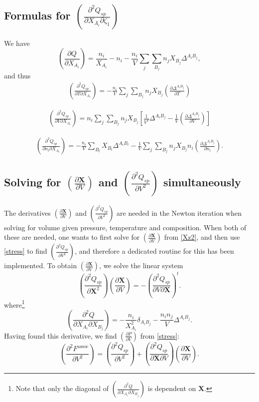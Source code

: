 \documentclass[10pt, a4paper]{article}
\newcommand{\mbf}[0]{\mathbf}
\newcommand*{\pder}[2]{\left(\frac{\partial #1}{\partial #2}\right)}
\newcommand*{\pdder}[2]{\left(\frac{\partial^2 #1}{\partial #2^2}\right)}
\newcommand*{\pdcross}[3]{\left(\frac{\partial^2 #1}{\partial #2 \partial #3}\right)}
\newcommand{\z}{\zeta}
\begin{document}
\subsection{Formulas for $\pdcross{Q_{sp}}{X_{A_i}}{\z_1}$}
We have
\begin{equation}
  \pder{Q}{X_{A_i}} = \frac{n_i}{X_{A_i}} - n_i  - \frac{n_i}{V} \sum_{j} \sum_{B_j} n_j X_{B_j} \Delta^{A_i B_j},
\end{equation}
and thus
\begin{align*}
  \pdcross{Q_{sp}}{T}{X_{A_i}} = -\frac{n_i}{V} \sum_{j} \sum_{B_j} n_j X_{B_j} \pder{\Delta^{A_i B_j}}{T}
\end{align*}

\begin{align*}
  \pdcross{Q_{sp}}{V}{X_{A_i}} = n_i \sum_{j} \sum_{B_j} n_j X_{B_j} \left[ \frac{1}{V^2} \Delta^{A_i B_j} - \frac{1}{V} \pder{\Delta^{A_i B_j}}{V} \right]
\end{align*}

\begin{align*}
  \pdcross{Q_{sp}}{n_l}{X_{A_i}} = - \frac{n_i}{V} \sum_{B_l} X_{B_l} \Delta^{A_i B_l} - \frac{1}{V} \sum_{j} \sum_{B_j} n_j X_{B_j} n_i \pder{\Delta^{A_i B_j}}{n_l}.
\end{align*}

\subsection{Solving for $\pder{\mbf X}{V}$ and $\pdder{Q_{sp}}{V}$ simultaneously}
The derivatives $\pder{\mbf X}{V}$ and $\pdder{Q_{sp}}{V}$ are needed in the Newton iteration when solving for volume given pressure, temperature and composition. When both of these are needed, one wants to first solve for $\pder{\mbf X}{V}$ from \eqref{Xz2}, and then use \eqref{stress} to find $\pdder{Q_{sp}}{V}$, and therefore a dedicated routine for this has been implemented. To obtain $\pder{\mbf X}{V}$, we solve the linear system
\begin{equation}
  \pdder{Q_{sp}}{\mbf X} \pder{\mbf X}{V} = -\pdcross{Q_{sp}}{V}{\mbf X}^t.
\end{equation}
where\footnote{Note that only the diagonal of $\pdcross{Q}{X_{A_i}}{X_{B_j}}$ is dependent on $\mbf X$.}
\begin{equation}
  \pdcross{Q}{X_{A_i}}{X_{B_j}} = -\frac{n_i}{X_{A_i}^2} \delta_{A_i B_j} - \frac{n_i n_j}{V} \Delta^{A_i B_j}.
\end{equation}
Having found this derivative, we find $\pder{P}{V}$ from \eqref{stress}:
\begin{equation}
    \pdder{F^{\text{assoc}}}{V} = \pdder{Q_{sp}}{V} + \pdcross{Q_{sp}}{\mbf X}{V} \pder{\mbf X}{V}.
\end{equation}
\end{document}
